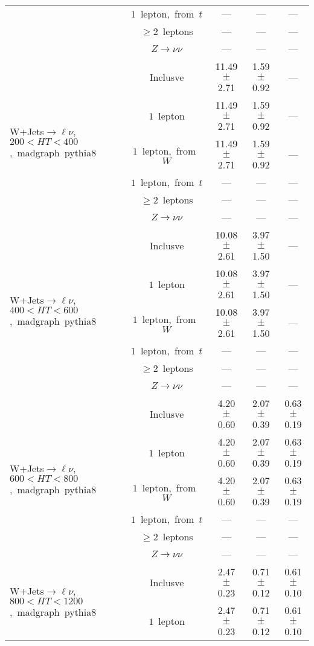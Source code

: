\documentclass{article}
\begin{document}
\begin{longtable}{|l|c|c|c|c|}
 & $1$~lepton,~from~$t$  & ---  & ---  & --- \\* 
 & $\ge2$~leptons  & ---  & ---  & --- \\* 
 & $Z\rightarrow\nu\nu$  & ---  & ---  & --- \\* 
\hline 
\multirow{6}{*}{W+Jets$\rightarrow\ell\nu$,~$200<HT<400$,~madgraph~pythia8} & Inclusve  & 11.49 $\pm$ 2.71  & 1.59 $\pm$ 0.92  & --- \\* 
 & $1$~lepton  & 11.49 $\pm$ 2.71  & 1.59 $\pm$ 0.92  & --- \\* 
 & $1$~lepton,~from~$W$  & 11.49 $\pm$ 2.71  & 1.59 $\pm$ 0.92  & --- \\* 
 & $1$~lepton,~from~$t$  & ---  & ---  & --- \\* 
 & $\ge2$~leptons  & ---  & ---  & --- \\* 
 & $Z\rightarrow\nu\nu$  & ---  & ---  & --- \\* 
\hline 
\multirow{6}{*}{W+Jets$\rightarrow\ell\nu$,~$400<HT<600$,~madgraph~pythia8} & Inclusve  & 10.08 $\pm$ 2.61  & 3.97 $\pm$ 1.50  & --- \\* 
 & $1$~lepton  & 10.08 $\pm$ 2.61  & 3.97 $\pm$ 1.50  & --- \\* 
 & $1$~lepton,~from~$W$  & 10.08 $\pm$ 2.61  & 3.97 $\pm$ 1.50  & --- \\* 
 & $1$~lepton,~from~$t$  & ---  & ---  & --- \\* 
 & $\ge2$~leptons  & ---  & ---  & --- \\* 
 & $Z\rightarrow\nu\nu$  & ---  & ---  & --- \\* 
\hline 
\multirow{6}{*}{W+Jets$\rightarrow\ell\nu$,~$600<HT<800$,~madgraph~pythia8} & Inclusve  & 4.20 $\pm$ 0.60  & 2.07 $\pm$ 0.39  & 0.63 $\pm$ 0.19 \\* 
 & $1$~lepton  & 4.20 $\pm$ 0.60  & 2.07 $\pm$ 0.39  & 0.63 $\pm$ 0.19 \\* 
 & $1$~lepton,~from~$W$  & 4.20 $\pm$ 0.60  & 2.07 $\pm$ 0.39  & 0.63 $\pm$ 0.19 \\* 
 & $1$~lepton,~from~$t$  & ---  & ---  & --- \\* 
 & $\ge2$~leptons  & ---  & ---  & --- \\* 
 & $Z\rightarrow\nu\nu$  & ---  & ---  & --- \\* 
\hline 
\multirow{6}{*}{W+Jets$\rightarrow\ell\nu$,~$800<HT<1200$,~madgraph~pythia8} & Inclusve  & 2.47 $\pm$ 0.23  & 0.71 $\pm$ 0.12  & 0.61 $\pm$ 0.10 \\* 
 & $1$~lepton  & 2.47 $\pm$ 0.23  & 0.71 $\pm$ 0.12  & 0.61 $\pm$ 0.10 \\* 

\end{longtable}
\end{document}
